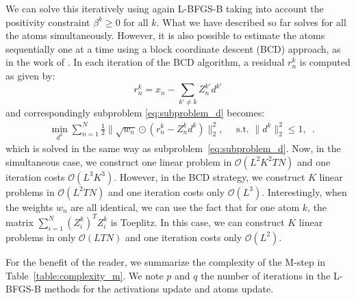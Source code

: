 \begin{appendices}
We can solve this iteratively using again L-BFGS-B taking into account the positivity constraint $\beta^k \geq 0$ for all $k$.
What we have described so far solves for all the atoms simultaneously. However, it is also possible to estimate the atoms sequentially one at a time using a block coordinate descent (BCD) approach, as in the work of \citep{mairal2010online}. In each iteration of the BCD algorithm, a residual $r_n^k$ is computed as given by:
%
\begin{equation}
r_n^k = x_n - \sum_{k'\neq k} Z^{k'}_{n}d^{k'}
\end{equation}
%
and correspondingly subproblem \ref{eq:subproblem_d} becomes:
%
\begin{align}
& \min_{d^k} \sum_{n=1}^{N} \frac{1}{2}\|\sqrt{w_n} \odot (r^k_{n} - Z^k_{n}d^k)\|_{2}^{2}, \quad \text{  s.t.  } \|d^k\|_2^2 \leq 1, \enspace.
\label{eq:subproblem_d_block}
\end{align}
%
which is solved in the same way as subproblem~\ref{eq:subproblem_d}. Now, in the simultaneous case, we construct one linear problem in $\mathcal{O}(L^2K^2TN)$ and one iteration costs $\mathcal{O}(L^3K^3)$. However, in the BCD strategy, we construct $K$ linear problems in $\mathcal{O}(L^2TN)$ and one iteration costs only $\mathcal{O}(L^3)$.
Interestingly, when the weights $w_n$ are all identical, we can 
use the fact that for one atom $k$, the matrix $\sum_{i=1}^{N}(Z_i^k)^T Z_i^k$ is Toeplitz. In this case, we can construct $K$ linear problems in only $\mathcal{O}(LTN)$ and one iteration costs only $\mathcal{O}(L^2)$.

For the benefit of the reader, we summarize the complexity of the M-step in Table~\ref{table:complexity_m}. We note $p$ and $q$ the number of iterations in the L-BFGS-B methods for the activations update and atoms update.



\end{appendices}
